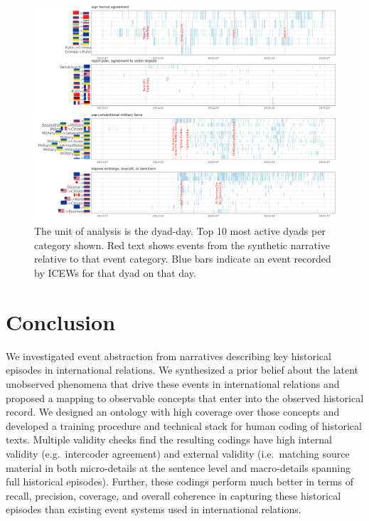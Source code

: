 \documentclass{article}
\begin{document}
\begin{figure}
\hypertarget{fig-precision-icews}{%
\centering
\includegraphics{p_precision_icews.png}
\caption{The unit of analysis is the dyad-day. Top 10 most active dyads
per category shown. Red text shows events from the synthetic narrative
relative to that event category. Blue bars indicate an event recorded by
ICEWs for that dyad on that day.}\label{fig-precision-icews}
}
\end{figure}

\hypertarget{conclusion}{%
\section{Conclusion}\label{conclusion}}

We investigated event abstraction from narratives describing key
historical episodes in international relations. We synthesized a prior
belief about the latent unobserved phenomena that drive these events in
international relations and proposed a mapping to observable concepts
that enter into the observed historical record. We designed an ontology
with high coverage over those concepts and developed a training
procedure and technical stack for human coding of historical texts.
Multiple validity checks find the resulting codings have high internal
validity (e.g.~intercoder agreement) and external validity
(i.e.~matching source material in both micro-details at the sentence
level and macro-details spanning full historical episodes). Further,
these codings perform much better in terms of recall, precision,
coverage, and overall coherence in capturing these historical episodes
than existing event systems used in international relations.
\end{document}
